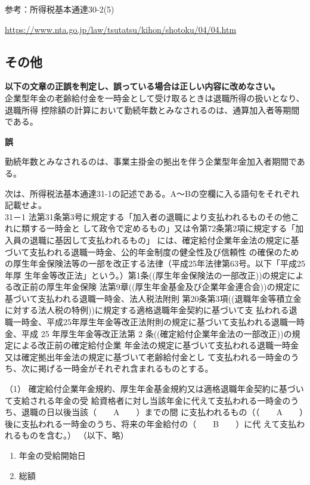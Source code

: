\begin{explanationbox}
  参考：所得税基本通達30-2(5)

  \url{https://www.nta.go.jp/law/tsutatsu/kihon/shotoku/04/04.htm}
\end{explanationbox}

\newpage

\subsection{その他}

\begin{truefalse}[年金1 2018 問題2(3)\textcircled{1}]
  \textbf{以下の文章の正誤を判定し、誤っている場合は正しい内容に改めなさい。}
\\  

  企業型年金の老齢給付金を一時金として受け取るときは退職所得の扱いとなり、退職所得
控除額の計算において勤続年数とみなされるのは、通算加入者等期間である。
\end{truefalse}

\begin{answerbox}
  \textbf{誤}

  勤続年数とみなされるのは、事業主掛金の拠出を伴う企業型年金加入者期間である。
\end{answerbox}

\begin{fillblank}[数理人試験 2025 問題6 設問4]
  次は、所得税法基本通達31-1の記述である。A～Bの空欄に入る語句をそれぞれ記載せよ。
\\

31－1 法第31条第3号に規定する「加入者の退職により支払われるものその他これに類する一時金と
して政令で定めるもの」又は令第72条第2項に規定する「加入員の退職に基因して支払われるもの」
には、確定給付企業年金法の規定に基づいて支払われる退職一時金、公的年金制度の健全性及び信頼性
の確保のための厚生年金保険法等の一部を改正する法律（平成25年法律第63号。以下「平成25年厚
生年金等改正法」という。）第1条((厚生年金保険法の一部改正))の規定による改正前の厚生年金保険
法第9章((厚生年金基金及び企業年金連合会))の規定に基づいて支払われる退職一時金、法人税法附則
第20条第3項((退職年金等積立金に対する法人税の特例))に規定する適格退職年金契約に基づいて支
払われる退職一時金、平成25年厚生年金等改正法附則の規定に基づいて支払われる退職一時金、平成
25 年厚生年金等改正法第 2 条((確定給付企業年金法の一部改正))の規定による改正前の確定給付企業
年金法の規定に基づいて支払われる退職一時金又は確定拠出年金法の規定に基づいて老齢給付金とし
て支払われる一時金のうち、次に掲げる一時金がそれぞれ含まれるものとする。

（1） 確定給付企業年金規約、厚生年金基金規約又は適格退職年金契約に基づいて支給される年金の受
給資格者に対し当該年金に代えて支払われる一時金のうち、退職の日以後当該（　　A　　）までの間
に支払われるもの（（　　A　　）後に支払われる一時金のうち、将来の年金給付の（　　B　　）に代
えて支払われるものを含む。）
（以下、略）
\end{fillblank}

\begin{answerbox}
  \begin{enumerate}[A:]
    \item 年金の受給開始日
    \item 総額
  \end{enumerate}
\end{answerbox}

\newpage
